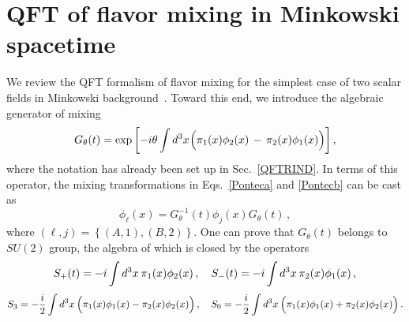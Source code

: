 \documentclass[floats,prd,aps,amssymb,nofootinbib,showkeys]{revtex4}
\newcommand{\be}{\begin{equation}}\newcommand{\ee}{\end{equation}}
\begin{document}
\section{QFT of flavor mixing in Minkowski spacetime}
\label{Qmix}
We review the QFT formalism of flavor mixing 
for the simplest case of two scalar fields
in Minkowski background~\cite{BlasCap}. 
Toward this end, we introduce the algebraic 
generator of mixing
\begin{equation}
G_\theta(t)=\exp\left[-i\theta\int d^3x\hspace{0.2mm}\Big(\pi_1(x)\phi_2(x)\,-\,\pi_2(x)\phi_1(x)\Big) \right],
\label{genmix}
\end{equation}
where the notation has already been 
set up in Sec.~\ref{QFTRIND}. 
In terms of this operator, the mixing transformations in Eqs.~\eqref{Ponteca} and \eqref{Pontecb} can be cast as
\be
\phi_\ell(x)=G_\theta^{-1}(t)\phi_j(x)G_\theta(t)\,,
\label{mixing2}
\ee
where $(\ell,j)=\left\{(A,1),(B,2)\right\}$. One can prove
that $G_\theta(t)$ belongs to $SU(2)$ group, the algebra of which 
is closed by the operators~\cite{BlasCap}
\begin{equation}
S_+(t)=-i\int d^3x\hspace{0.7mm}\pi_1(x)\phi_2(x)\,,\quad S_{-}(t)=-i\int d^3x\hspace{0.7mm}\pi_2(x)\phi_1(x)\,,
\end{equation}
\vspace{-4mm}
\begin{equation}
S_3=-\frac{i}{2}\int d^3x\hspace{0.7mm}\Big(\pi_1(x)\phi_1(x)-\pi_2(x)\phi_2(x)\Big)\,,\quad S_0=-\frac{i}{2}\int d^3x\hspace{0.7mm}\Big(\pi_1(x)\phi_1(x)+\pi_2(x)\phi_2(x)\Big)\,.
\end{equation}
\end{document}
